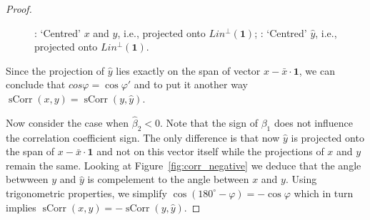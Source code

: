 \documentclass[nobib]{tufte-handout}
\DeclareMathOperator{\sCorr}{sCorr}
\begin{document}
\begin{proof}
\begin{figure}[h!]
\begin{center}
\hspace{4ex}
\caption{: `Centred' $x$ and $y$, i.e., projected onto $Lin^{\perp}(\mathbf{1})$; : `Centred' $\hat y$, i.e., projected onto $Lin^{\perp}(\mathbf{1})$.}
\end{center}
\end{figure}

Since the projection of $\hat y$ lies exactly on the span of vector $x - \bar x \cdot \mathbf{1}$, we can conclude that $cos \varphi = \cos \varphi '$ and to put it another way $\sCorr(x,y) = \sCorr(y, \hat y)$.

Now consider the case when $\hat \beta_2 < 0$.
Note that the sign of $\beta_1$ does not influence the correlation coefficient sign.
The only difference is that now $\hat y$ is projected onto the span of  $x - \bar x \cdot \mathbf{1}$ and not on this vector itself while the projections of $x$ and $y$ remain the same.
Looking at Figure~\ref{fig:corr_negative} we deduce that the angle betwween $y$ and $\hat y$ is compelement to the angle between $x$ and $y$.
Using trigonometric properties, we simplify $\cos(180^{\circ} - \varphi) = -\cos\varphi$ which in turn implies $\sCorr(x,y) = -\sCorr(y,\hat y)$.


\end{proof}
\end{document}
